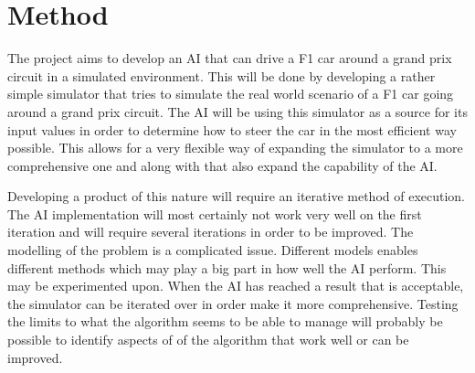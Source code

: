 




\chapter{Method}
The project aims to develop an AI that can drive a F1 car around a grand prix circuit in a simulated environment. This will be done by developing a rather simple simulator that tries to simulate the real world scenario of a F1 car going around a grand prix circuit. The AI will be using this simulator as a source for its input values in order to determine how to steer the car in the most efficient way possible. This allows for a very flexible way of expanding the simulator to a more comprehensive one and along with that also expand the capability of the AI.

Developing a product of this nature will require an iterative method of execution. The AI implementation will most certainly not work very well on the first iteration and will require several iterations in order to be improved. The modelling of the problem is a complicated issue. Different models enables different methods which may play a big part in how well the AI perform. This may be experimented upon. When the AI has reached a result that is acceptable, the simulator can be iterated over in order make it more comprehensive. Testing the limits to what the algorithm seems to be able to manage will probably be possible to identify aspects of of the algorithm that work well or can be improved.

